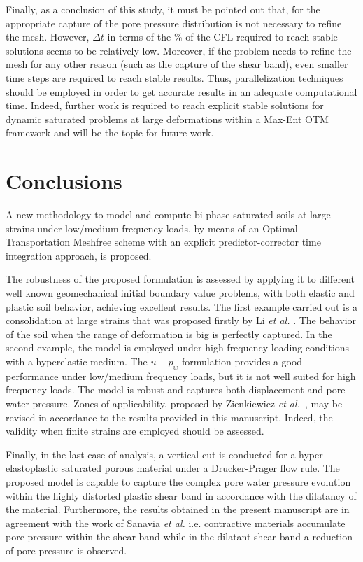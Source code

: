 \documentclass[twocolumn]{svjour3}          %
\begin{document}
{Finally, as a conclusion of this study, it must be pointed out that, for the appropriate capture of the pore pressure distribution is not necessary to refine the mesh. However, $\Delta t$ in terms of the \% of the CFL required to reach stable solutions seems to be relatively low. Moreover, if the problem needs to refine the mesh for any other reason (such as the capture of the shear band), even smaller time steps are required to reach stable results. Thus, parallelization techniques should be employed in order to get accurate results in an adequate computational time. Indeed, further work is required to reach explicit stable solutions for dynamic saturated problems at large deformations within a  Max-Ent OTM framework and will be the topic for future work.
}

\section{Conclusions}
\label{sec:6}
A new methodology to model and compute bi-phase saturated soils at large strains under low/medium frequency loads, by means of an Optimal Transportation Meshfree scheme with an explicit predictor-corrector time integration approach, is proposed.

The robustness of the proposed formulation is assessed by applying it to different well known geomechanical initial boundary value problems, with both elastic and plastic soil behavior, achieving excellent results. The first example carried out is a consolidation at large strains that was proposed firstly by Li \textit{et al.} \cite{LiBorja2004}. The behavior of the soil when the range of deformation is big is perfectly captured. In the second example, the model is employed under high frequency loading conditions with a hyperelastic medium. The $u-p_w$ formulation provides a good performance under low/medium frequency loads, but it is not well suited for high frequency loads. The model is robust and captures both displacement and pore water pressure. Zones of applicability, proposed by Zienkiewicz \textit{et al.}~\cite{zienkiewicz1980}, may be revised in accordance to the results provided in this manuscript. Indeed, the validity when finite strains are employed should be assessed.

Finally, in the last case of analysis, a vertical cut is conducted for a hyper-elastoplastic saturated porous material under a Drucker-Prager flow rule. The proposed model is capable to capture the complex pore water pressure evolution within the highly distorted plastic shear band in accordance with the dilatancy of the  material. Furthermore, the results obtained in the present manuscript are in agreement with the work of Sanavia \textit{et al.}\cite{Sanavia:02b} i.e. contractive materials accumulate pore pressure within the shear band  while  in  the  dilatant  shear  band  a  reduction of pore pressure is observed.
\end{document}
